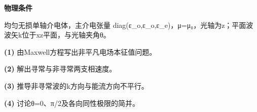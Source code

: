 \textbf{物理条件}\par 均匀无损单轴介电体，主介电张量 diag(ε\_o,ε\_o,ε\_e)，μ=μ₀，光轴为z；平面波波矢k位于xz平面，与光轴夹角θ。
\par\noindent\textbf{(1)} 由Maxwell方程写出非平凡电场本征值问题。
\par\noindent\textbf{(2)} 解出寻常与非寻常两支相速度。
\par\noindent\textbf{(3)} 推导非寻常波的k方向与能流方向不平行。
\par\noindent\textbf{(4)} 讨论θ=0、π/2及各向同性极限的简并。
